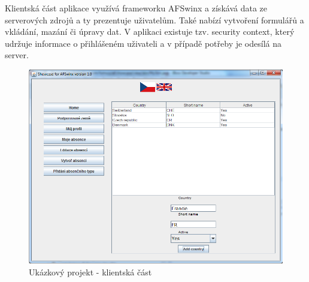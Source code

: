 Klientská část aplikace využívá frameworku AFSwinx a získává data ze serverových zdrojů a ty prezentuje uživatelům. Také nabízí vytvoření formulářů a vkládání, mazání či úpravy dat. V aplikaci existuje tzv. security context, který udržuje informace o přihlášeném uživateli a v případě potřeby je odesílá na server. 

\begin{figure}[h!]
\includegraphics[width=\linewidth]{images/showcase}
\caption{Ukázkový projekt - klientská část}  
\label{img:view}
\end{figure}

